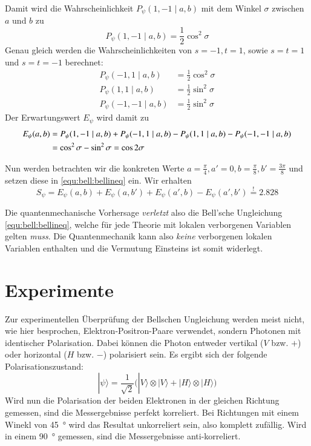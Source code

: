 \begin{refsection}
Damit wird die Wahrscheinlichkeit $P_{\psi}(1,-1 \mid a,b)$ mit dem Winkel
$\sigma$ zwischen $a$ und $b$ zu
\begin{equation}
    P_{\psi}(1,-1 \mid a,b) = \frac{1}{2} \cos^2\sigma
\end{equation}
Genau gleich werden die Wahrscheinlichkeiten von $s=-1,t=1$, sowie
$s=t=1$ und $s=t=-1$ berechnet:
\begin{align}
    P_{\psi}(-1,1 \mid a,b) &= \frac{1}{2} \cos^2\sigma \\
    P_{\psi}(1,1 \mid a,b) &= \frac{1}{2} \sin^2\sigma \\
    P_{\psi}(-1,-1 \mid a,b) &= \frac{1}{2} \sin^2\sigma
\end{align}
Der Erwartungswert $E_{\psi}$ wird damit zu
\begin{align}
    E_{\psi}(a,b) &= P_{\psi}(1,-1 \mid a,b) + P_{\psi}(-1,1 \mid a,b) -
        P_{\psi}(1,1 \mid a,b) - P_{\psi}(-1,-1 \mid a,b)  \notag \\
    &= \cos^2\sigma - \sin^2\sigma  = \cos 2\sigma
\end{align}

Nun werden betrachten wir die konkreten Werte 
$a=\frac{\pi}{4}, a'=0, b=\frac{\pi}{8}, b' = \frac{3\pi}{8}$ 
und setzen diese in \eqref{equ:bell:bellineq} ein. Wir erhalten
\begin{equation}
    S_{\psi} = E_{\psi}(a,b) + E_{\psi}(a,b') + E_{\psi}(a',b) - E_{\psi}(a',b') \stackrel{!}{=} 2.828
    \label{equ:bell:bellineq_beweis}
\end{equation}

Die quantenmechanische Vorhersage \emph{verletzt} also die Bell'sche 
Ungleichung \eqref{equ:bell:bellineq}, welche f\"ur jede Theorie mit lokalen
verborgenen Variablen gelten \emph{muss}.
Die Quantenmechanik kann also \emph{keine} verborgenen lokalen Variablen
enthalten und die Vermutung Einsteins ist somit widerlegt.

\section{Experimente}

Zur experimentellen \"Uberpr\"ufung der Bellschen Ungleichung werden meist
nicht, wie hier besprochen, Elektron-Positron-Paare verwendet, sondern
Photonen mit identischer Polarisation.
Dabei k\"onnen die Photon entweder vertikal ($V$ bzw. $+$) oder horizontal
($H$ bzw. $-$) polarisiert sein. 
Es ergibt sich der folgende Polarisationszustand:
\begin{equation}
    |\psi\rangle = \frac{1}{\sqrt{2}} \Big(
        |V\rangle \otimes |V\rangle + |H\rangle \otimes |H\rangle
    \Big)
\end{equation}
Wird nun die Polarisation der beiden Elektronen in der gleichen Richtung 
gemessen, sind die Messergebnisse perfekt korreliert.
Bei Richtungen mit einem Winekl von \SI{45}{\degree} wird das Resultat
unkorreliert sein, also komplett zuf\"allig.
Wird in einem \SI{90}{\degree} gemessen, sind die Messergebnisse
anti-korreliert.


\end{refsection}
